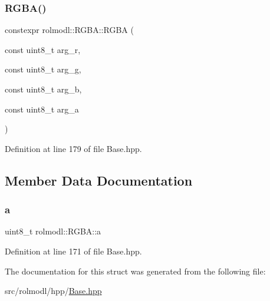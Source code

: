 \subsubsection{\texorpdfstring{RGBA()}{RGBA()}\hspace{0.1cm}{\footnotesize\ttfamily [3/3]}}
{\footnotesize\ttfamily constexpr rolmodl\+::\+R\+G\+B\+A\+::\+R\+G\+BA (\begin{DoxyParamCaption}\item[{const uint8\+\_\+t}]{arg\+\_\+r,  }\item[{const uint8\+\_\+t}]{arg\+\_\+g,  }\item[{const uint8\+\_\+t}]{arg\+\_\+b,  }\item[{const uint8\+\_\+t}]{arg\+\_\+a }\end{DoxyParamCaption})\hspace{0.3cm}{\ttfamily [inline]}}



Definition at line 179 of file Base.\+hpp.



\subsection{Member Data Documentation}
\mbox{\label{structrolmodl_1_1_r_g_b_a_ac0b2a99fa0fe7bbc949cf9907e512f07}} 
\subsubsection{\texorpdfstring{a}{a}}
{\footnotesize\ttfamily uint8\+\_\+t rolmodl\+::\+R\+G\+B\+A\+::a}



Definition at line 171 of file Base.\+hpp.



The documentation for this struct was generated from the following file\+:\begin{DoxyCompactItemize}
\item 
src/rolmodl/hpp/\mbox{\hyperlink{_base_8hpp}{Base.\+hpp}}\end{DoxyCompactItemize}
